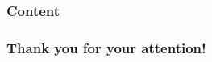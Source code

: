 %
%

\begin{frame}
	\titlepage
\end{frame}

\begin{frame}
	\frametitle{Content}
	\setcounter{tocdepth}{1}
	\tableofcontents
\end{frame}

	
	
		
%

%
	
\begin{frame}
	\frametitle{Thank you for your attention!}
\end{frame}